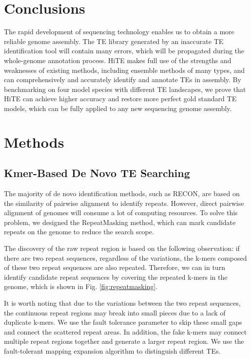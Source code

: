 \documentclass{bmcart}
\begin{document}
\section*{Conclusions}
The rapid development of sequencing technology enables us to obtain a more reliable genome assembly. The TE library generated by an inaccurate TE identification tool will contain many errors, which will be propagated during the whole-genome annotation process. HiTE makes full use of the strengths and weaknesses of existing methods, including ensemble methods of many types, and can comprehensively and accurately identify and annotate TEs in assembly. By benchmarking on four model species with different TE landscapes, we prove that HiTE can achieve higher accuracy and restore more perfect gold standard TE models, which can be fully applied to any new sequencing genome assembly.

\section*{Methods}

\subsection*{Kmer-Based De Novo TE Searching}
The majority of de novo identification methods, such as RECON, are based on the similarity of pairwise alignment to identify repeats. However, direct pairwise alignment of genomes will consume a lot of computing resources. To solve this problem, we designed the RepeatMasking method, which can mark candidate repeats on the genome to reduce the search scope.

The discovery of the raw repeat region is based on the following observation: if there are two repeat sequences, regardless of the variations, the k-mers composed of these two repeat sequences are also repeated. Therefore, we can in turn identify candidate repeat sequences by covering the repeated k-mers in the genome, which is shown in Fig. \ref{fig:repeatmasking}.

It is worth noting that due to the variations between the two repeat sequences, the continuous repeat regions may break into small pieces due to a lack of duplicate k-mers. We use the fault tolerance parameter to skip these small gaps and connect the scattered repeat areas. In addition, the fake k-mers may connect multiple repeat regions together and generate a larger repeat region. We use the fault-tolerant mapping expansion algorithm to distinguish different TEs.
\end{document}

